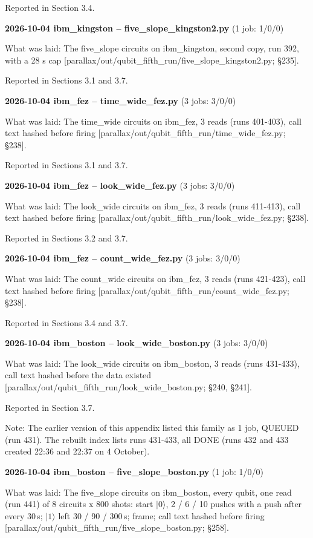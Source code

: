\documentclass[11pt]{article}
\begin{document}
Reported in Section 3.4.

\textbf{2026-10-04 ibm\_kingston -- five\_slope\_kingston2.py} (1 job: 1/0/0)

What was laid: The five\_slope circuits on ibm\_kingston, second copy, run 392, with a 28 s cap {[}parallax/out/qubit\_fifth\_run/five\_slope\_kingston2.py; \S{}235{]}.

Reported in Sections 3.1 and 3.7.

\textbf{2026-10-04 ibm\_fez -- time\_wide\_fez.py} (3 jobs: 3/0/0)

What was laid: The time\_wide circuits on ibm\_fez, 3 reads (runs 401-403), call text hashed before firing {[}parallax/out/qubit\_fifth\_run/time\_wide\_fez.py; \S{}238{]}.

Reported in Sections 3.1 and 3.7.

\textbf{2026-10-04 ibm\_fez -- look\_wide\_fez.py} (3 jobs: 3/0/0)

What was laid: The look\_wide circuits on ibm\_fez, 3 reads (runs 411-413), call text hashed before firing {[}parallax/out/qubit\_fifth\_run/look\_wide\_fez.py; \S{}238{]}.

Reported in Sections 3.2 and 3.7.

\textbf{2026-10-04 ibm\_fez -- count\_wide\_fez.py} (3 jobs: 3/0/0)

What was laid: The count\_wide circuits on ibm\_fez, 3 reads (runs 421-423), call text hashed before firing {[}parallax/out/qubit\_fifth\_run/count\_wide\_fez.py; \S{}238{]}.

Reported in Sections 3.4 and 3.7.

\textbf{2026-10-04 ibm\_boston -- look\_wide\_boston.py} (3 jobs: 3/0/0)

What was laid: The look\_wide circuits on ibm\_boston, 3 reads (runs 431-433), call text hashed before the data existed {[}parallax/out/qubit\_fifth\_run/look\_wide\_boston.py; \S{}240, \S{}241{]}.

Reported in Section 3.7.

Note: The earlier version of this appendix listed this family as 1 job, QUEUED (run 431). The rebuilt index lists runs 431-433, all DONE (runs 432 and 433 created 22:36 and 22:37 on 4 October).

\textbf{2026-10-04 ibm\_boston -- five\_slope\_boston.py} (1 job: 1/0/0)

What was laid: The five\_slope circuits on ibm\_boston, every qubit, one read (run 441) of 8 circuits x 800 shots: start \(|0\rangle\), 2 / 6 / 10 pushes with a push after every 30\,\textmu s; \(|1\rangle\) left 30 / 90 / 300\,\textmu s; frame; call text hashed before firing {[}parallax/out/qubit\_fifth\_run/five\_slope\_boston.py; \S{}258{]}.
\end{document}
